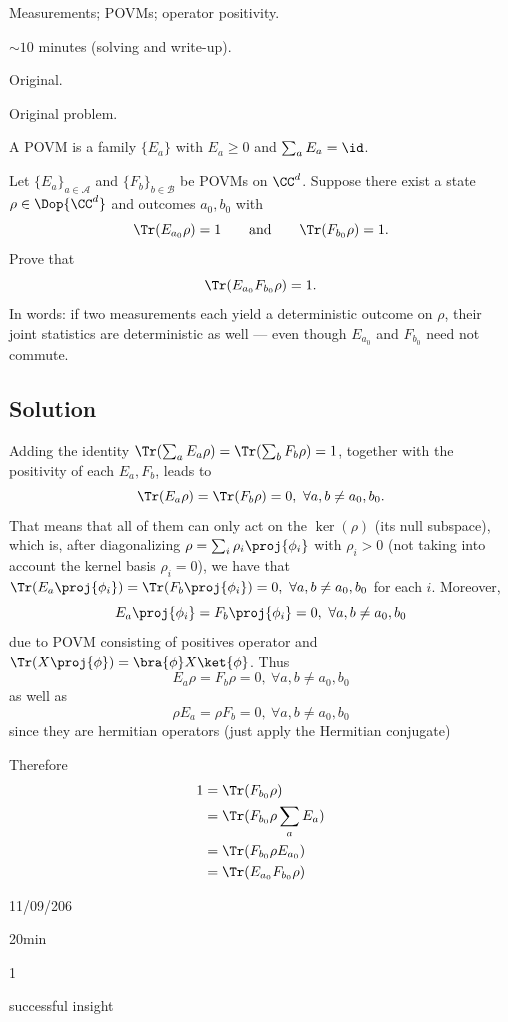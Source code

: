 
\begin{daymeta}
  \item[Topic] Measurements; POVMs; operator positivity.
  \item[Estimated time] $\sim 10$ minutes (solving and write-up).
  \item[Origin] Original.
  \item[Source] Original problem.
  \item[Prerequisites] A POVM is a family $\{E_a\}$ with $E_a\ge 0$ and
    $\sum_a E_a=\id$.
\end{daymeta}

\begin{problem}
Let $\{E_a\}_{a\in\mathcal A}$ and $\{F_b\}_{b\in\mathcal B}$ be POVMs on $\CC^d$.
Suppose there exist a state $\rho\in\Dop{\CC^d}$ and outcomes $a_0,b_0$ with
\[
  \Tr(E_{a_0}\rho)=1
  \qquad\text{and}\qquad
  \Tr(F_{b_0}\rho)=1 .
\]
Prove that
\[
  \Tr(E_{a_0}F_{b_0}\rho)=1 .
\]
In words: if two measurements each yield a deterministic outcome on $\rho$, their joint
statistics are deterministic as well --- even though $E_{a_0}$ and $F_{b_0}$ need not
commute.
\end{problem}

\subsection*{Solution}

\begin{solution}
Adding the identity $\Tr(\sum_a E_a \rho)=\Tr(\sum_b F_b \rho)=1$, together with the positivity of each $E_a,F_b$, leads to $$\Tr(E_a\rho)=\Tr(F_b\rho)=0,\ \forall a,b\neq a_0,b_0.$$ That means that all of them can only act on the $\ker(\rho)$ (its null subspace), which is, after diagonalizing $\rho= \sum_i \rho_i \proj{\phi_i}$ with $\rho_i>0$ (not taking into account the kernel basis $\rho_i=0$), we have that $\Tr(E_a\proj{\phi_i})=\Tr(F_b\proj{\phi_i})=0,\ \forall a,b\neq a_0,b_0$ for each $i$. Moreover,
$$E_a\proj{\phi_i}=F_b\proj{\phi_i}=0,\ \forall a,b\neq a_0,b_0$$
due to POVM consisting of positives operator and $\Tr(X\proj{\phi})=\bra{\phi}X\ket{\phi}$. Thus
$$E_a\rho=F_b\rho=0,\ \forall a,b\neq a_0,b_0$$ as well as 
$$\rho E_a=\rho F_b=0,\ \forall a,b\neq a_0,b_0$$
since they are hermitian operators (just apply the Hermitian conjugate)

Therefore
\begin{equation}
\begin{split}
     1&= \Tr(F_{b_0}\rho)\\
     &= \Tr(F_{b_0}\rho\sum_aE_a)\\
     &= \Tr(F_{b_0}\rho E_{a_0})\\
     &= \Tr(E_{a_0}F_{b_0}\rho )
\end{split}
\end{equation}
\end{solution}


\begin{attemptlog}
  \item[Date] 11/09/206
  \item[Time taken] 20min
  \item[Difficulty] 1
  \item[Error type] successful insight
\end{attemptlog}